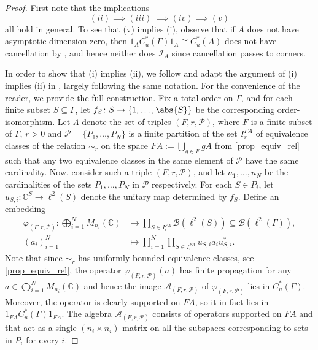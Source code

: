 \documentclass[12pt, a4paper, oneside]{amsart}
\newcommand{\0}{\mathbf{0}}
\newcommand{\1}{\mathbf{1}}
\newcommand{\C}{\mathbb{C}}   %
\newcommand{\A}{\mathscr{A}}
\newcommand{\B}{\mathscr{B}}
\renewcommand{\P}{\mathcal{P}} %
\newcommand{\I}{\mathscr{I}}
\begin{document}
	\begin{proof}
	First note that the implications 
	\[(ii) \implies (iii)\ \implies (iv) \implies (v)\] all hold in general. To see that (v) implies (i), observe that if \(A\) does not have asymptotic dimension zero, then \(1_A C_u^*(\Gamma) 1_A \cong C_u^*(A)\) does not have cancellation by \cite[Theorem 2.2]{li2018low}, and hence neither does \(\I_A\) since cancellation passes to corners. 
	
	In order to show that (i) implies (ii), we follow and adapt the argument of (i) implies (ii) in \cite[Theorem 2.2]{li2018low}, largely following the same notation. For the convenience of the reader, we provide the full construction. Fix a total order on \(\Gamma\), and for each finite subset \(S \subseteq \Gamma\), let \(f_S \colon S \to \{1, \ldots, \abs{S}\}\) be the corresponding order-isomorphism. Let \(\Lambda\) denote the set of triples \((F, r, \P)\), where \(F\) is a finite subset of \(\Gamma\), \(r > 0\) and \(\P = \{P_1, \ldots, P_N\}\) is a finite partition of the set \(I^{FA}_r\) of equivalence classes of the relation \(\sim_r\) on the space \(FA := \bigcup_{g \in F} gA\) from \cref{prop_equiv_rel} such that any two equivalence classes in the same element of \(\P\) have the same cardinality. Now, consider such a triple \((F, r, \P)\), and let \(n_1, \ldots, n_N\) be the cardinalities of the sets \(P_1, \ldots, P_N\) in \(\P\) respectively. For each \(S \in P_i\), let \(u_{S, i} \colon \C^{S} \to \ell^2(S)\) denote the unitary map determined by \(f_S\). Define an embedding 
	\begin{align*} 
		\varphi_{(F, r, \P)} \colon \bigoplus_{i=1}^N M_{n_i}(\C) & \to \prod_{S \in I_r^{FA}} \B(\ell^2(S)) \subseteq \B(\ell^2(\Gamma)), \\
		(a_i)_{i=1}^N & \mapsto \prod_{i=1}^N \prod_{S \in I_r^{FA}} u_{S, i} a_i u_{S, i}^*. 
	\end{align*}
	Note that since \(\sim_r\) has uniformly bounded equivalence classes, see \cref{prop_equiv_rel}, the operator \(\varphi_{(F, r, \P)}(a)\) has finite propagation for any \(a \in \bigoplus_{i=1}^N M_{n_i}(\C)\) and hence the image \(\A_{(F, r, \P)}\) of \(\varphi_{(F, r, \P)}\) lies in \(C_u^*(\Gamma)\). Moreover, the operator is clearly supported on \(FA\), so it in fact lies in \(1_{FA} C_u^*(\Gamma) 1_{FA}\). The algebra \(\A_{(F, r, \P)}\) consists of operators supported on \(FA\) and that act as a single \((n_i \times n_i)\)-matrix on all the subspaces corresponding to sets in \(P_i\) for every \(i\). 
	

\end{proof}
\end{document}

